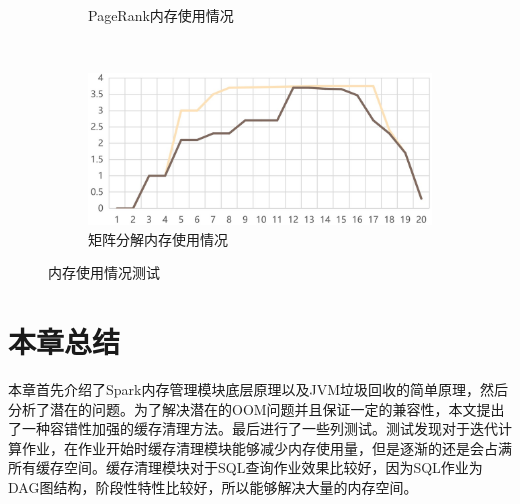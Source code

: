 \begin{figure}[!htbp]
\begin{subfigure}[b]{0.45\linewidth}
      \caption{PageRank内存使用情况}
      \label{fig:pagerank-use}
    \end{subfigure}%
    ~%
    \begin{subfigure}[b]{0.45\linewidth}
      \includegraphics[width=\textwidth]{Img/matrix-use.jpg}
      \caption{矩阵分解内存使用情况}
      \label{fig:matrix-use}
    \end{subfigure}
    \caption{内存使用情况测试}
    \label{fig:memory-use}
\end{figure}

\section{本章总结}

本章首先介绍了Spark内存管理模块底层原理以及JVM垃圾回收的简单原理，然后分析了潜在的问题。为了解决潜在的OOM问题并且保证一定的兼容性，本文提出了一种容错性加强的缓存清理方法。最后进行了一些列测试。测试发现对于迭代计算作业，在作业开始时缓存清理模块能够减少内存使用量，但是逐渐的还是会占满所有缓存空间。缓存清理模块对于SQL查询作业效果比较好，因为SQL作业为DAG图结构，阶段性特性比较好，所以能够解决大量的内存空间。
